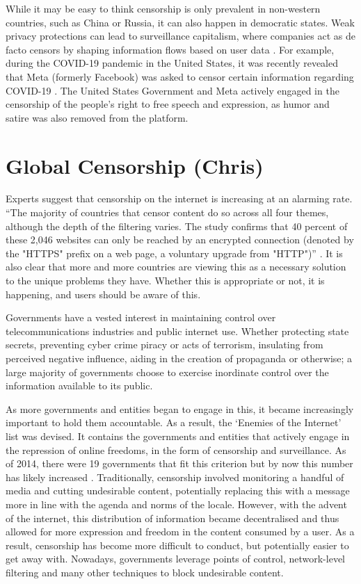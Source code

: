 While it may be easy to think censorship is only prevalent in non-western countries, such as China or Russia, it can also happen in democratic states. Weak privacy protections can lead to surveillance capitalism, where companies act as de facto censors by shaping information flows based on user data \cite{schwartz1999internet}. For example, during the COVID-19 pandemic in the United States, it was recently revealed that Meta (formerly Facebook) was asked to censor certain information regarding COVID-19 \cite{pbsZuckerbergSays}. The United States Government and Meta actively engaged in the censorship of the people's right to free speech and expression, as humor and satire was also removed from the platform.

\section{Global Censorship (Chris)}

Experts suggest that censorship on the internet is increasing at an alarming rate. “The majority of countries that censor content do so across all four themes, although the depth of the filtering varies. The study confirms that 40 percent of these 2,046 websites can only be reached by an 
encrypted connection (denoted by the "HTTPS" prefix on a web page, a voluntary upgrade from "HTTP")” \cite{zittrain2017shifting}. It is also clear that more and more countries are viewing this as a necessary solution to the unique problems they have. Whether this is appropriate or not, it is happening, and users should be aware of this. 

Governments have a vested interest in maintaining control over telecommunications industries and public internet use. Whether protecting state secrets, preventing cyber crime piracy or acts of terrorism, insulating from perceived negative influence, aiding in the creation of propaganda or otherwise; a large majority of governments choose to exercise inordinate control over the 
information available to its public.  

As more governments and entities began to engage in this, it became increasingly important to hold them accountable. As a result, the ‘Enemies of the Internet’ list was devised. It contains the governments and entities that actively engage in the repression of online freedoms, in the form of censorship and surveillance. As of 2014, there were 19 governments that fit this criterion but by now this number has likely increased \cite{GlobalCensorshipRef2}. Traditionally, censorship involved monitoring a handful of media and cutting undesirable content, potentially replacing this with a message more in line with the agenda and norms of the locale. However, with the advent of the internet, this distribution of information became decentralised and thus allowed for more expression and freedom in the content consumed by a user. As a result, censorship has become more difficult to conduct, but potentially easier to get away with. Nowadays, governments leverage points of control, network-level filtering and many other techniques to block undesirable content.




